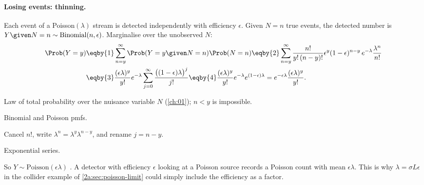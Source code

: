 \paragraph{Losing events: thinning.} Each event of a Poisson$(\lambda)$ stream is detected independently with efficiency $\epsilon$. Given $N=n$ true events, the detected number is $Y\given N=n\sim\mathrm{Binomial}(n,\epsilon)$. Marginalise over the unobserved $N$:
\begin{align*}
  \Prob(Y=y)
  &\eqby{1} \sum_{n=y}^\infty\Prob(Y=y\given N=n)\Prob(N=n)
  \eqby{2} \sum_{n=y}^\infty\frac{n!}{y!\,(n-y)!}\epsilon^y(1-\epsilon)^{n-y}\,e^{-\lambda}\frac{\lambda^n}{n!}\\
  &\eqby{3} \frac{(\epsilon\lambda)^y}{y!}e^{-\lambda}\sum_{j=0}^\infty\frac{\bigl((1-\epsilon)\lambda\bigr)^{j}}{j!}
  \eqby{4} \frac{(\epsilon\lambda)^y}{y!}e^{-\lambda}e^{(1-\epsilon)\lambda}
  = e^{-\epsilon\lambda}\frac{(\epsilon\lambda)^y}{y!}.
\end{align*}
\begin{explain}
  \item Law of total probability over the nuisance variable $N$ (\cref{ch:01}); $n<y$ is impossible.
  \item Binomial and Poisson pmfs.
  \item Cancel $n!$, write $\lambda^n=\lambda^y\lambda^{n-y}$, and rename $j=n-y$.
  \item Exponential series.
\end{explain}
So $Y\sim\mathrm{Poisson}(\epsilon\lambda)$ . A detector with efficiency $\epsilon$ looking at a Poisson source records a Poisson count with mean $\epsilon\lambda$. This is why $\lambda=\sigma L\epsilon$ in the collider example of \cref{2a:sec:poisson-limit} could simply include the efficiency as a factor.

